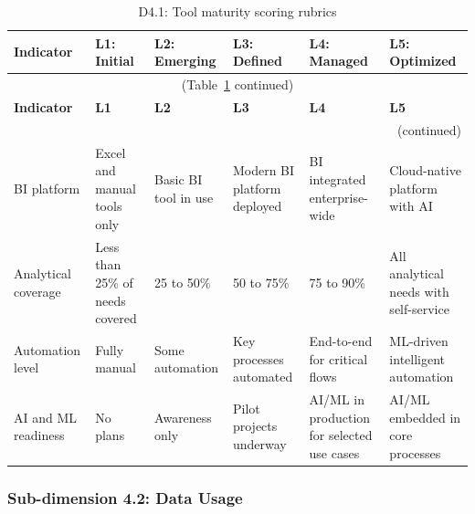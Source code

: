 \begin{center}
{\small
\begin{longtable}{|p{2.4cm}|p{2.0cm}|p{2.0cm}|p{2.2cm}|p{2.2cm}|p{2.2cm}|}
\caption{D4.1: Tool maturity scoring rubrics} \label{tab:d4-1} \\
\hline
\textbf{Indicator} & \textbf{L1: Initial} & \textbf{L2: Emerging} & \textbf{L3: Defined} & \textbf{L4: Managed} & \textbf{L5: Optimized} \\
\hline
\endfirsthead
\multicolumn{6}{c}{\small (Table~\ref{tab:d4-1} continued)} \\
\hline
\textbf{Indicator} & \textbf{L1} & \textbf{L2} & \textbf{L3} & \textbf{L4} & \textbf{L5} \\
\hline
\endhead
\hline
\multicolumn{6}{r}{\small (continued)} \\
\endfoot
\hline
\endlastfoot
BI platform &
  Excel and manual tools only &
  Basic BI tool in use &
  Modern BI platform deployed &
  BI integrated enterprise-wide &
  Cloud-native platform with AI \\
\hline
Analytical coverage &
  Less than 25\% of needs covered &
  25 to 50\% &
  50 to 75\% &
  75 to 90\% &
  All analytical needs with self-service \\
\hline
Automation level &
  Fully manual &
  Some automation &
  Key processes automated &
  End-to-end for critical flows &
  ML-driven intelligent automation \\
\hline
AI and ML readiness &
  No plans &
  Awareness only &
  Pilot projects underway &
  AI/ML in production for selected use cases &
  AI/ML embedded in core processes \\
\hline
\end{longtable}
}
\end{center}

\subsubsection*{Sub-dimension 4.2: Data Usage}

